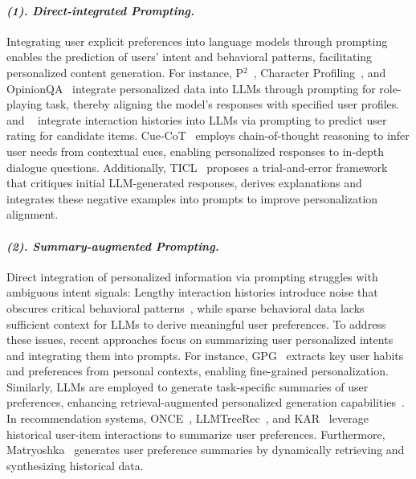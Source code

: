 \paragraph{\textbf{\textit{{(1). Direct-integrated Prompting.}}}}
Integrating user explicit preferences into language models through prompting enables the prediction of users' intent and behavioral patterns, facilitating personalized content generation. For instance, P$^2$~\cite{jiang2023evaluating}, Character Profiling~\cite{yuan2024evaluating}, and OpinionQA~\cite{santurkar2023whose} integrate personalized data into LLMs through prompting for role-playing task, thereby aligning the model's responses with specified user profiles. ~\citet{kang2023llms} and ~\citet{liu2023chatgpt} integrate interaction histories into LLMs via prompting to predict user rating for candidate items. Cue-CoT~\cite{wang2023cue} employs chain-of-thought reasoning to infer user needs from contextual cues, enabling personalized responses to in-depth dialogue questions. Additionally, TICL~\cite{cho2025tuning} proposes a trial-and-error framework that critiques initial LLM-generated responses, derives explanations and integrates these negative examples into prompts to improve personalization alignment.

\paragraph{\textbf{\textit{{(2). Summary-augmented Prompting.}}}}
Direct integration of personalized information via prompting struggles with ambiguous intent signals: Lengthy interaction histories introduce noise that obscures critical behavioral patterns~\cite{liu2024lost}, while sparse behavioral data lacks sufficient context for LLMs to derive meaningful user preferences. To address these issues, recent approaches focus on summarizing user personalized intents and integrating them into prompts. For instance, GPG~\cite{zhang2024guided} extracts key user habits and preferences from personal contexts, enabling fine-grained personalization. Similarly, LLMs are employed to generate task-specific summaries of user preferences, enhancing retrieval-augmented personalized generation capabilities~\cite{richardson2023integrating}. In recommendation systems, ONCE~\cite{liu2024once}, LLMTreeRec~\cite{zhang2025llmtreerec}, and KAR~\cite{xi2024towards} leverage historical user-item interactions to summarize user preferences. Furthermore, Matryoshka~\cite{li2024matryoshka} generates user preference summaries by dynamically retrieving and synthesizing historical data.

